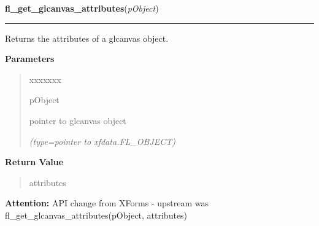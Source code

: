 \hspace{.8\funcindent}\begin{boxedminipage}{\funcwidth}

    \raggedright \textbf{fl\_get\_glcanvas\_attributes}(\textit{pObject})

    \vspace{-1.5ex}

    \rule{\textwidth}{0.5\fboxrule}
\setlength{\parskip}{2ex}
    Returns the attributes of a glcanvas object.

\setlength{\parskip}{1ex}
      \textbf{Parameters}
      \vspace{-1ex}

      \begin{quote}
        \begin{Ventry}{xxxxxxx}

          \item[pObject]

          pointer to glcanvas object

            {\it (type=pointer to xfdata.FL\_OBJECT)}

        \end{Ventry}

      \end{quote}

      \textbf{Return Value}
    \vspace{-1ex}

      \begin{quote}
      attributes

      \end{quote}

\textbf{Attention:} API change from XForms - upstream was 
fl\_get\_glcanvas\_attributes(pObject, attributes)



    \end{boxedminipage}

    \label{xformslib:library:fl_set_glcanvas_direct}

    \vspace{0.5ex}

